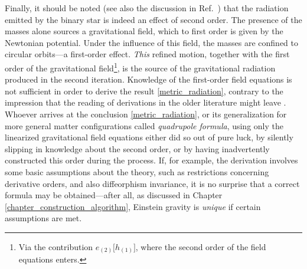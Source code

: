 Finally, it should be noted (see also the discussion in Ref.~\cite{poisson}) that the radiation emitted by the binary star is indeed an effect of second order. The presence of the masses alone sources a gravitational field, which to first order is given by the Newtonian potential. Under the influence of this field, the masses are confined to circular orbits---a first-order effect. \emph{This} refined motion, together with the first order of the gravitational field\footnote{Via the contribution $e_{(2)}\lbrack h_{(1)}\rbrack$, where the second order of the field equations enters.}, is the source of the gravitational radiation produced in the second iteration. Knowledge of the first-order field equations is not sufficient in order to derive the result \eqref{metric_radiation}, contrary to the impression that the reading of derivations in the older literature might leave \cite{mtw?}. Whoever arrives at the conclusion \eqref{metric_radiation}, or its generalization for more general matter configurations called \emph{quadrupole formula}, using only the linearized gravitational field equations either did so out of pure luck, by silently slipping in knowledge about the second order, or by having inadvertently constructed this order during the process. If, for example, the derivation involves some basic assumptions about the theory, such as restrictions concerning derivative orders, and also diffeorphism invariance, it is no surprise that a correct formula may be obtained---after all, as discussed in Chapter \ref{chapter_construction_algorithm}, Einstein gravity is \emph{unique} if certain assumptions are met.

